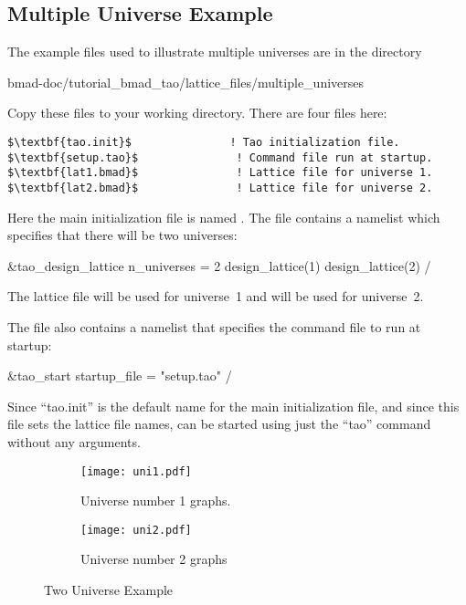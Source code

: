 \documentclass{hitec}     %
\begin{document}
{%
\subsection{Multiple Universe Example}

The example files used to illustrate multiple universes are in the directory 
\begin{code}
bmad-doc/tutorial_bmad_tao/lattice_files/multiple_universes
\end{code}
Copy these files to your working directory. There are four files here:
\begin{lstlisting}[mathescape]
$\textbf{tao.init}$               ! Tao initialization file.
$\textbf{setup.tao}$               ! Command file run at startup.
$\textbf{lat1.bmad}$               ! Lattice file for universe 1.
$\textbf{lat2.bmad}$               ! Lattice file for universe 2.
\end{lstlisting}

Here the main initialization file is named . The  file contains a
 namelist which specifies that there will be two universes:
\begin{code}
&tao_design_lattice
  n_universes = 2
  design_lattice(1)%
  design_lattice(2)%
/
\end{code}
The lattice file  will be used for universe~1 and  will be used for
universe~2.

The  file also contains a  namelist that specifies the command file to
run at startup:
\begin{code}
&tao_start
  startup_file = "setup.tao"
/
\end{code}

Since ``tao.init'' is the default name for the main initialization file, and since this file sets the lattice file names, \tao can be started using just the ``tao'' command without any arguments.

\begin{figure}[tb]
  \centering
  \begin{subfigure}[t]{0.49\textwidth}
    \texttt{[image: uni1.pdf]}
    \caption{Universe number 1 graphs.}
    \label{f:uni1}
  \end{subfigure}
  \hfil
  \begin{subfigure}[t]{0.49\textwidth}
    \texttt{[image: uni2.pdf]}
    \caption{Universe number 2 graphs}
    \label{f:uni2}
  \end{subfigure}
  \caption{Two Universe Example}
\end{figure}

}
\end{document}
